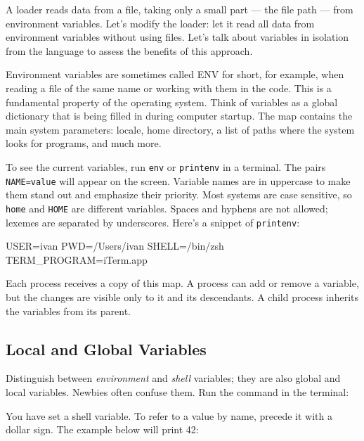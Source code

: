 A loader reads data from a file, taking only a small part — the file path — from environment variables. Let's modify the loader: let it read all data from environment variables without using files. Let's talk about variables in isolation from the language to assess the benefits of this approach.

Environment variables are sometimes called ENV for short, for example, when reading a file of the same name or working with them in the code. This is a fundamental property of the operating system. Think of variables as a global dictionary that is being filled in during computer startup. The map contains the main system parameters: locale, home directory, a list of paths where the system looks for programs, and much more.


To see the current variables, run \verb|env| or \verb|printenv| in a terminal. The pairs \verb|NAME=value| will appear on the screen. Variable names are in uppercase to make them stand out and emphasize their priority. Most systems are case sensitive, so \verb|home| and \verb|HOME| are different variables. Spaces and hyphens are not allowed; lexemes are separated by underscores. Here's a snippet of \verb|printenv|:

\begin{bash}
USER=ivan
PWD=/Users/ivan
SHELL=/bin/zsh
TERM_PROGRAM=iTerm.app
\end{bash}

Each process receives a copy of this map. A process can add or remove a variable, but the changes are visible only to it and its descendants. A child process inherits the variables from its parent.

\subsection{ Local and Global Variables }


Distinguish between \emph{environment} and \emph{shell} variables; they are also global and local variables. Newbies often confuse them. Run the command in the terminal:


You have set a shell variable. To refer to a value by name, precede it with a dollar sign. The example below will print 42:

